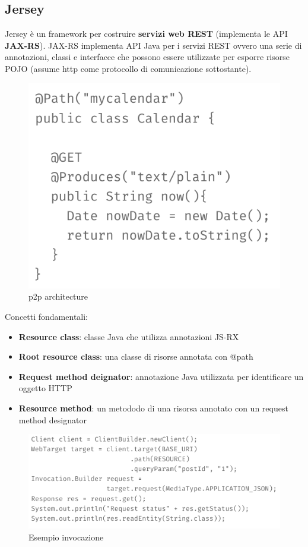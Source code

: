 \documentclass[12pt]{article}
\begin{document}
 \subsection{Jersey}
	Jersey è un framework per costruire \textbf{servizi web REST} (implementa le API \textbf{JAX-RS}).
	JAX-RS implementa API Java per i servizi REST ovvero una serie di annotazioni, classi e interfacce che possono essere utilizzate per esporre risorse POJO (assume http come protocollo di comunicazione sottostante). 
	\begin{figure}[h!]
		\centering
		\includegraphics[scale=0.40]{img/pojo.png}
		\caption{p2p architecture}
	\end{figure}
	Concetti fondamentali:
	\begin{itemize}
		\item \textbf{Resource class}: classe Java che utilizza annotazioni JS-RX
		\item \textbf{Root resource class}: una classe di risorse annotata con @path
		\item \textbf{Request method deignator}: annotazione Java utilizzata per identificare un oggetto HTTP
		\item \textbf{Resource method}: un metododo di una risorsa annotato con un request method designator  
	\end{itemize}
	\begin{figure}[h!]
		\centering
		\includegraphics[scale=0.40]{img/invoc.png}
		\caption{Esempio invocazione}
	\end{figure}
\end{document}
